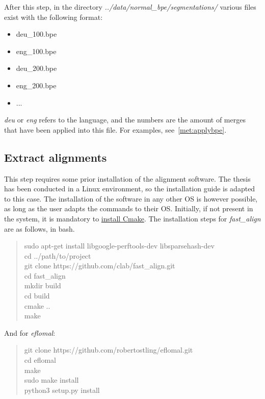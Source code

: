 After this step, in the directory \emph{../data/normal\_bpe/segmentations/} various files exist with the following format:

\begin{itemize}
  \item deu\_100.bpe
  \item eng\_100.bpe
  \item deu\_200.bpe
  \item eng\_200.bpe
  \item ...
\end{itemize}

\emph{deu} or \emph{eng} refers to the language, and the numbers are the amount of merges that have been applied into this file. For examples, see~\ref{met:applybpe}.

\subsection{Extract alignments}\label{dev:extractalign}

This step requires some prior installation of the alignment software. The thesis has been conducted in a Linux environment, so the installation guide is adapted to this case. The installation of the software in any other OS is however possible, as long as the user adapts the commands to their OS. Initially, if not present in the system, it is mandatory to \href{https://cmake.org/install/}{install Cmake}. The installation steps for \emph{fast\_align} are as follows, in bash.

\begin{quote}
  sudo apt-get install libgoogle-perftools-dev libsparsehash-dev\\
  cd ../path/to/project\\
  git clone https://github.com/clab/fast\_align.git\\
  cd fast\_align\\
  mkdir build\\
  cd build\\
  cmake ..\\
  make
\end{quote}

And for \emph{eflomal}:

\begin{quote}
  git clone https://github.com/robertostling/eflomal.git\\
  cd eflomal\\
  make\\
  sudo make install\\
  python3 setup.py install
\end{quote}

